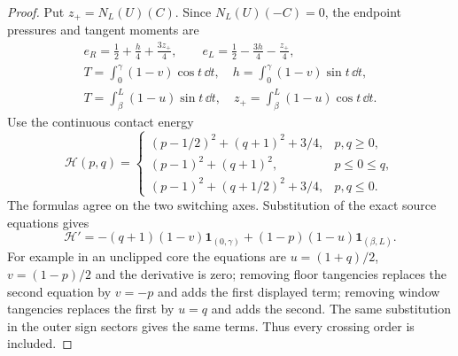 \begin{proof}
Put $z_+=N_L(U)(C)$. Since $N_L(U)(-C)=0$, the endpoint
pressures and tangent moments are
\begin{equation}\label{eq:tilted-strip-moments}
 \begin{gathered}
 e_R=\tfrac12+\tfrac h4+\tfrac{3z_+}4,\qquad
 e_L=\tfrac12-\tfrac{3h}4-\tfrac{z_+}4,\\
 T=\int_0^\gamma(1-v)\cos t\,\dd t,
 \quad h=\int_0^\gamma(1-v)\sin t\,\dd t,\\
 T=\int_\beta^L(1-u)\sin t\,\dd t,
 \quad z_+=\int_\beta^L(1-u)\cos t\,\dd t.
 \end{gathered}
\end{equation}
Use the continuous contact energy
\begin{equation}\label{eq:tilted-contact-energy}
 \mathcal H(p,q)=
 \begin{cases}
 (p-1/2)^2+(q+1)^2+3/4,&p,q\ge0,\\
 (p-1)^2+(q+1)^2,&p\le0\le q,\\
 (p-1)^2+(q+1/2)^2+3/4,&p,q\le0.
 \end{cases}
\end{equation}
The formulas agree on the two switching axes. Substitution of
the exact source equations gives
\[
 \mathcal H'=-(q+1)(1-v)\mathbf1_{(0,\gamma)}
                  +(1-p)(1-u)\mathbf1_{(\beta,L)}.
\]
For example in an unclipped core the equations are
$u=(1+q)/2$, $v=(1-p)/2$ and the derivative is zero;
removing floor tangencies replaces the second equation by
$v=-p$ and adds the first displayed term; removing window
tangencies replaces the first by $u=q$ and adds the second.
The same substitution in the outer sign sectors gives the
same terms. Thus every crossing order is included.


\end{proof}
